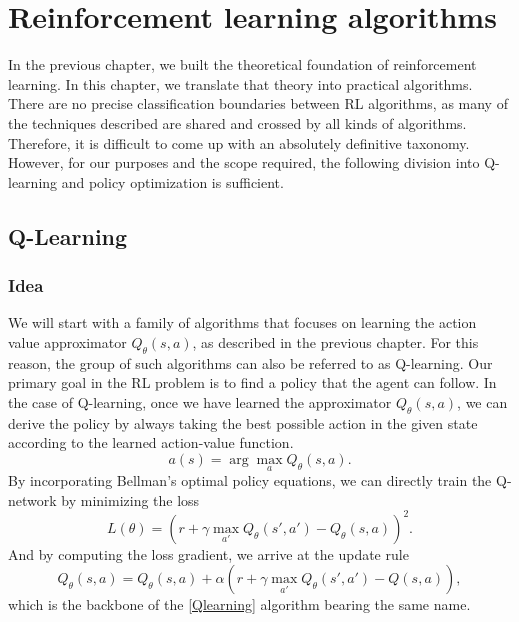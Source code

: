 \chapter{Reinforcement learning algorithms}\label{RLChapter}

In the previous chapter, we built the theoretical foundation of reinforcement learning.
In this chapter, we translate that theory into practical algorithms.
There are no precise classification boundaries between RL algorithms, as many of the techniques described are shared and crossed by all kinds of algorithms.
Therefore, it is difficult to come up with an absolutely definitive taxonomy.
However, for our purposes and the scope required, the following division into Q-learning and policy optimization is sufficient.

\section{Q-Learning}

\subsection*{Idea}
We will start with a family of algorithms that focuses on learning the action value approximator $Q_\theta(s,a)$, as described in the previous chapter.
For this reason, the group of such algorithms can also be referred to as Q-learning.
Our primary goal in the RL problem is to find a policy that the agent can follow.
In the case of Q-learning, once we have learned the approximator $Q_\theta(s,a)$, we can derive the policy by always taking the best possible action in the given state according to the learned action-value function.
\[a(s) = \arg \max_a Q_\theta(s,a).\]
By incorporating Bellman's optimal policy equations, we can directly train the Q-network by minimizing the loss
\[L(\theta)=(r + \gamma \max_{a'} Q_\theta(s',a') - Q_\theta(s,a))^2.\]
And by computing the loss gradient, we arrive at the update rule
\[Q_\theta(s,a) = Q_\theta(s,a) + \alpha (r + \gamma \max_{a'}Q_\theta(s',a') - Q(s,a)),\]
which is the backbone of the \ref*{Qlearning} algorithm bearing the same name.
